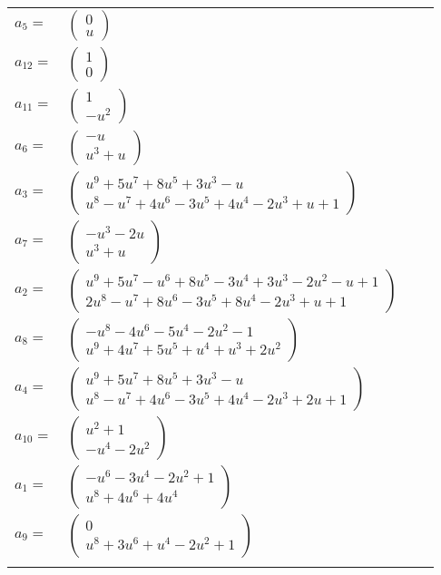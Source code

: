 \documentclass[1p]{elsarticle_modified}
\theoremstyle{definition}
\begin{document}
\begin{tabular}{m{7pt} m{180pt} m{7pt} m{180pt} }
\flushright $a_{5}=$&$\begin{pmatrix}0\\u\end{pmatrix}$ \\
\flushright $a_{12}=$&$\begin{pmatrix}1\\0\end{pmatrix}$ \\
\flushright $a_{11}=$&$\begin{pmatrix}1\\- u^2\end{pmatrix}$ \\
\flushright $a_{6}=$&$\begin{pmatrix}- u\\u^3+u\end{pmatrix}$ \\
\flushright $a_{3}=$&$\begin{pmatrix}u^9+5 u^7+8 u^5+3 u^3- u\\u^8- u^7+4 u^6-3 u^5+4 u^4-2 u^3+u+1\end{pmatrix}$ \\
\flushright $a_{7}=$&$\begin{pmatrix}- u^3-2 u\\u^3+u\end{pmatrix}$ \\
\flushright $a_{2}=$&$\begin{pmatrix}u^9+5 u^7- u^6+8 u^5-3 u^4+3 u^3-2 u^2- u+1\\2 u^8- u^7+8 u^6-3 u^5+8 u^4-2 u^3+u+1\end{pmatrix}$ \\
\flushright $a_{8}=$&$\begin{pmatrix}- u^8-4 u^6-5 u^4-2 u^2-1\\u^9+4 u^7+5 u^5+u^4+u^3+2 u^2\end{pmatrix}$ \\
\flushright $a_{4}=$&$\begin{pmatrix}u^9+5 u^7+8 u^5+3 u^3- u\\u^8- u^7+4 u^6-3 u^5+4 u^4-2 u^3+2 u+1\end{pmatrix}$ \\
\flushright $a_{10}=$&$\begin{pmatrix}u^2+1\\- u^4-2 u^2\end{pmatrix}$ \\
\flushright $a_{1}=$&$\begin{pmatrix}- u^6-3 u^4-2 u^2+1\\u^8+4 u^6+4 u^4\end{pmatrix}$ \\
\flushright $a_{9}=$&$\begin{pmatrix}0\\u^8+3 u^6+u^4-2 u^2+1\end{pmatrix}$\\&\end{tabular}
\end{document}
